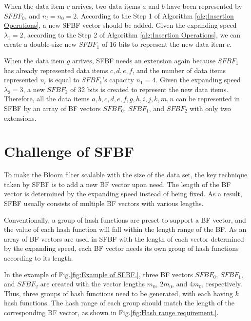 \documentclass[10pt,journal,letterpaper]{IEEEtran}
\newcommand{\note}[1]{{\sffamily\itshape\bfseries\uline{#1}}}
\begin{document}
When the data item $c$ arrives, two data items $a$ and $b$ have been represented by $SFBF_0$, and $n_l=n_0=2$. According to the Step 1 of Algorithm \ref{alg:Insertion Operations}, a new SFBF vector should be added. Given the expanding speed ${\lambda _1} = 2$, according to the Step 2 of Algorithm \ref{alg:Insertion Operations}, we can create a double-size new $SFBF_1$ of 16 bits to represent the new data item $c$.

When the data item $g$ arrives, SFBF needs an extension again because $SFBF_1$ has already represented data items $c, d, e, f$, and the number of data items represented $n_l$ is equal to $SFBF_1$'s capacity $n_1=4$.
Given the expanding speed ${\lambda _2} = 3$,  a new $SFBF_2$ of 32 bits is created to represent the new data items. Therefore, all the data items $a, b, c, d, e, f, g, h, i, j, k, m, n$ can be represented in SFBF by an array of BF vectors $SFBF_0$, $SFBF_1$, and $SFBF_2$ with only two extensions.

\section{Challenge of SFBF}
\label{sec:Challenge in SFBF}
To make the Bloom filter scalable with the size of the data set, the key technique taken by SFBF is to add a new BF vector upon need. The length of the BF vector is determined by the expanding speed instead of being fixed.
  As a result, SFBF usually consists of multiple BF vectors with various lengths. %


Conventionally, a group of hash functions are preset to support a BF vector, and the value of each hash function will fall within the length range of the BF. As an array of BF vectors are used in SFBF with the length of each vector determined by the expanding speed, each BF vector needs its own group of hash functions according to its length.

In the example of Fig.\ref{fig:Example of SFBF.}, three BF vectors $SFBF_0$, $SFBF_1$, and $SFBF_2$ are created with the vector lengths $m_0$, $2m_0$, and $4m_0$, respectively. Thus, three groups of hash functions need to be generated, with each having $k$ hash functions. The hash range of each group should match the length of the corresponding BF vector, as shown in Fig.\ref{fig:Hash range requirement.}.
\end{document}
